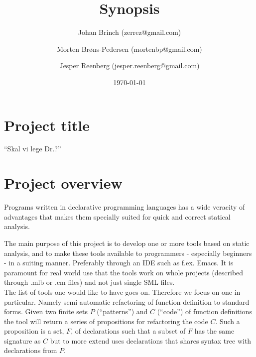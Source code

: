 \documentclass[a4paper,oneside]{memoir}
\title{Synopsis}
\author{Johan Brinch (zerrez@gmail.com) \and
Morten Brøns-Pedersen (mortenbp@gmail.com) \and
Jesper Reenberg (jesper.reenberg@gmail.com)}
\date{\today}
\begin{document}
\maketitle

\section{Project title}

``Skal vi lege Dr.?''

\section{Project overview}

Programs written in declarative programming languages has a wide veracity of
advantages that makes them specially suited for quick and correct statical
analysis.


The main purpose of this project is to develop one or more tools based on static analysis, and to
make these tools available to programmers - especially beginners - in a suiting manner. Preferably
through an IDE such as f.ex. Emacs. It is paramount for real world use that the tools work on whole
projects (described through .mlb or .cm files) and not just single SML files.\\

The list of tools one would like to have goes on. Therefore we focus on one in particular. Namely
semi automatic refactoring of function definition to standard forms. Given two finite sets $P$
(``patterns'') and $C$ (``code'') of function definitions the tool will return a series of
propositions for refactoring the code $C$. Such a proposition is a set, $F$, of declarations such that a
subset of $F$ has the same signature as $C$ but to more extend uses declarations that shares syntax tree
with declarations from $P$.



%
\end{document}

